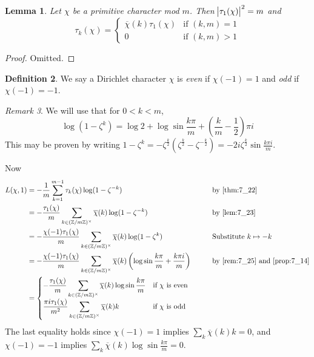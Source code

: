 \documentclass[11pt]{article}
\theoremstyle{definition}
\newtheorem{definition}{Definition}[section]
\theoremstyle{plain}
\newtheorem{lemma}[definition]{Lemma}
\theoremstyle{remark}
\newtheorem{remark}[definition]{Remark}
\newcommand{\ZZ}{\mathbb{Z}}
\begin{document}
\begin{lemma}\label{lem:7_23}
    Let $\chi$ be a primitive character mod $m$. Then $\abs{\tau_1(\chi)}^2 = m$ and
    \begin{equation*}
        \tau_k(\chi) = \begin{cases}
            \overline{\chi}(k) \tau_1(\chi) & \text{if } (k,m)=1\\
            0 & \text{if } (k,m) > 1
        \end{cases}
    \end{equation*}
\end{lemma}
\begin{proof}
    Omitted.
\end{proof}

\begin{definition}\label{def:7_24}
    We say a Dirichlet character $\chi$ is \emph{even} if $\chi(-1) = 1$ and \emph{odd} if $\chi(-1) = -1$.
\end{definition}

\begin{remark}\label{rem:7_25}
    We will use that for $0 < k < m$,
    \begin{equation*}
        \log(1-\zeta^k) = \log 2 + \log \sin \frac{k \pi}{m} + \left(\frac{k}{m} - \frac{1}{2}\right) \pi i
    \end{equation*}
    {\color{blue} This may be proven by writing $1 - \zeta^k = -\zeta^{\frac{k}{2}} (\zeta^{\frac{k}{2}} - \zeta^{-\frac{k}{2}}) = -2i \zeta^{\frac{k}{2}} \sin \frac{k \pi i}{m}$.}
\end{remark}
\noindent Now
\begin{alignat*}{3}
    L(\chi, 1)
    &= -\frac{1}{m} \sum_{k=1}^{m-1} \tau_k(\chi) \log(1 - \zeta^{-k}) &&\qquad \text{by \ref{thm:7_22}}\\
    &= -\frac{\tau_1(\chi)}{m} \sum_{k \in (\ZZ / m\ZZ)^\times} \overline{\chi}(k) \log(1 - \zeta^{-k}) &&\qquad \text{by \ref{lem:7_23}}\\
    &= -\frac{\chi(-1) \tau_1(\chi)}{m} \sum_{k \in (\ZZ / m\ZZ)^\times} \overline{\chi}(k) \log(1 - \zeta^k) &&\qquad \text{Substitute } k \mapsto -k\\
    &= -\frac{\chi(-1) \tau_1(\chi)}{m} \sum_{k \in (\ZZ / m\ZZ)^\times} \overline{\chi}(k) \left(\log \sin \frac{k \pi}{m} + \frac{k \pi i}{m}\right) &&\qquad \text{by \ref{rem:7_25} and \ref{prop:7_14}}\\
    &= \begin{cases}
        \displaystyle-\frac{\tau_1(\chi)}{m} \sum_{k \in (\ZZ / m\ZZ)^\times} \overline{\chi}(k) \log \sin \frac{k \pi}{m} & \text{if } \chi \text{ is even}\\
        \displaystyle\frac{\pi i \tau_1(\chi)}{m^2} \sum_{k \in (\ZZ / m\ZZ)^\times} \overline{\chi}(k) k & \text{if } \chi \text{ is odd}
    \end{cases}
\end{alignat*}
The last equality holds since $\chi(-1) = 1$ implies $\sum_k \overline{\chi}(k) k = 0$, and $\chi(-1) = -1$ implies $\sum_k \overline{\chi}(k) \log \sin \frac{k \pi}{m} = 0$.
\end{document}
